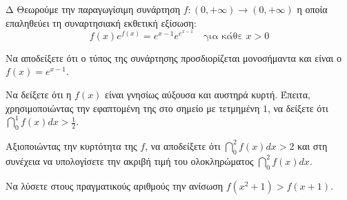 \begin{thema}{Δ}
Θεωρούμε την παραγωγίσιμη συνάρτηση $f: (0, +\infty) \to (0, +\infty)$ η οποία επαληθεύει τη συναρτησιακή εκθετική εξίσωση:
\[ f(x) e^{f(x)} = e^{x-1} e^{e^{x-1}} \quad \text{για κάθε } x > 0 \]
\begin{erwthma}
    \item Να αποδείξετε ότι ο τύπος της συνάρτησης προσδιορίζεται μονοσήμαντα και είναι ο $f(x) = e^{x-1}$. 
    \item Να δείξετε ότι η $f(x)$ είναι γνησίως αύξουσα και αυστηρά κυρτή. Έπειτα, χρησιμοποιώντας την εφαπτομένη της στο σημείο με τετμημένη $1$, να δείξετε ότι $\dint_0^1 f(x) dx > \frac{1}{2}$. 
    \item Αξιοποιώντας την κυρτότητα της $f$, να αποδείξετε ότι $\dint_0^2 f(x) dx > 2$ και στη συνέχεια να υπολογίσετε την ακριβή τιμή του ολοκληρώματος $\dint_0^2 f(x) dx$. 
    \item Να λύσετε στους πραγματικούς αριθμούς την ανίσωση $f(x^2 + 1) > f(x + 1)$. 
\end{erwthma}
\end{thema}
